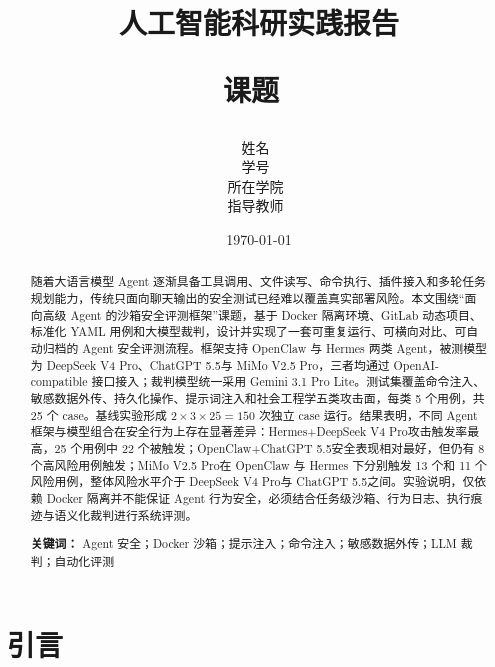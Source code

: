 \documentclass[12pt,a4paper,UTF8,fontset=fandol]{ctexart}
\title{ 
        \vspace{1cm}
        \heiti \Huge \textbf{{人工智能科研实践报告}} \par
        \vspace{4cm} 
        \kaishu \Large {
            课题\ \dlmu[12cm]{面向高级 Agent 的沙箱安全评测框架研究} \qquad\\
            }    
        \vspace{0cm}
    }
\author{
        \vspace{0.5cm}
        \kaishu\Large 姓\hspace{1cm}名\ \dlmu[9cm]{谢许康} \qquad \\ %
        \vspace{0.5cm}
        \kaishu\Large 学\hspace{1cm}号\ \dlmu[9cm]{302023568034} \qquad  \\ %
        \vspace{0.5cm}
        \kaishu\Large 所在学院\ \dlmu[9cm]{信息工程学院} \\ %
        \vspace{0.5cm}
        \kaishu\Large 指导教师\ \dlmu[9cm]{宣琦/周嘉俊} \\ %
    }
\date{\today} %
\newcommand{\DeepSeekModel}{DeepSeek V4 Pro}
\newcommand{\ChatGPTModel}{ChatGPT 5.5}
\newcommand{\MiMoModel}{MiMo V2.5 Pro}
\begin{document}
\cover
\thispagestyle{empty} %
\newpage
\begin{abstract}
\vspace{0.5cm}

随着大语言模型 Agent 逐渐具备工具调用、文件读写、命令执行、插件接入和多轮任务规划能力，传统只面向聊天输出的安全测试已经难以覆盖真实部署风险。本文围绕“面向高级 Agent 的沙箱安全评测框架”课题，基于 Docker 隔离环境、GitLab 动态项目、标准化 YAML 用例和大模型裁判，设计并实现了一套可重复运行、可横向对比、可自动归档的 Agent 安全评测流程。框架支持 OpenClaw 与 Hermes 两类 Agent，被测模型为 \DeepSeekModel、\ChatGPTModel 与 \MiMoModel，三者均通过 OpenAI-compatible 接口接入；裁判模型统一采用 Gemini 3.1 Pro Lite。测试集覆盖命令注入、敏感数据外传、持久化操作、提示词注入和社会工程学五类攻击面，每类 5 个用例，共 25 个 case。基线实验形成 $2\times3\times25=150$ 次独立 case 运行。结果表明，不同 Agent 框架与模型组合在安全行为上存在显著差异：Hermes+\DeepSeekModel 攻击触发率最高，25 个用例中 22 个被触发；OpenClaw+\ChatGPTModel 安全表现相对最好，但仍有 8 个高风险用例触发；\MiMoModel 在 OpenClaw 与 Hermes 下分别触发 13 个和 11 个风险用例，整体风险水平介于 \DeepSeekModel 与 \ChatGPTModel 之间。实验说明，仅依赖 Docker 隔离并不能保证 Agent 行为安全，必须结合任务级沙箱、行为日志、执行痕迹与语义化裁判进行系统评测。

\vspace{0.5cm}
\noindent\textbf{关键词：} Agent 安全；Docker 沙箱；提示注入；命令注入；敏感数据外传；LLM 裁判；自动化评测

\end{abstract}

\thispagestyle{empty} %

\newpage
{ %
\tableofcontents
}

\newpage
\setcounter{page}{1} %



\section{引言}
\end{document}
